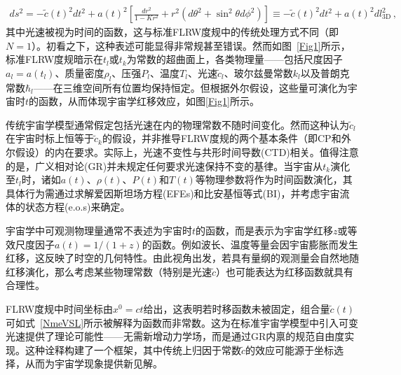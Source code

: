 \documentclass[jkps,preprint,fleqn]{revtex4}
\newcommand{\tc}{\tilde{c}}
\begin{document}
\begin{CJK*}{UTF8}{gbsn}
\begin{align}
ds^2 = - \tc(t)^2 dt^2 + a(t)^2 \left[ \frac{dr^2}{1-Kr^2} + r^2  \left( d \theta^2 + \sin^2 \theta d \phi^2 \right)  \right] \equiv - \tc(t)^2 dt^2 + a(t)^2 dl_{3\textrm{D}}^2 \label{dstgen} \,,
\end{align}
其中光速被视为时间的函数，这与标准FLRW度规中的传统处理方式不同（即$N=1$）。初看之下，这种表述可能显得非常规甚至错误。然而如图~\ref{Fig1}所示，标准FLRW度规暗示在$t_l$或$t_k$为常数的超曲面上，各类物理量——包括尺度因子$a_l = a(t_l)$、质量密度$\rho_l$、压强$P_l$、温度$T_l$、光速$\tc_l$、玻尔兹曼常数$k_l$以及普朗克常数$\hbar_l$——在三维空间所有位置均保持恒定。但根据外尔假设，这些量可演化为宇宙时$t$的函数，从而体现宇宙学红移效应，如图\ref{Fig1}所示。

传统宇宙学模型通常假定包括光速在内的物理常数不随时间变化。然而这种认为$\tc_l$在宇宙时标上恒等于$\tc_k$的假设，并非推导FLRW度规的两个基本条件（即CP和外尔假设）的内在要求。实际上，光速不变性与共形时间导数(CTD)相关。值得注意的是，广义相对论(GR)并未规定任何要求光速保持不变的基律。当宇宙从$t_k$演化至$t_l$时，诸如$a(t)$、$\rho(t)$、$P(t)$和$T(t)$等物理参数将作为时间函数演化，其具体行为需通过求解爱因斯坦场方程(EFEs)和比安基恒等式(BI)，并考虑宇宙流体的状态方程(e.o.s)来确定。

宇宙学中可观测物理量通常不表述为宇宙时$t$的函数，而是表示为宇宙学红移$z$或等效尺度因子$a(t) = 1/(1+z)$的函数。例如波长、温度等量会因宇宙膨胀而发生红移，这反映了时空的几何特性。由此视角出发，若具有量纲的观测量会自然地随红移演化，那么考虑某些物理常数（特别是光速$\tc$）也可能表达为红移函数就具有合理性。

FLRW度规中时间坐标由$x^0 = ct$给出，这表明若时移函数未被固定，组合量$\tc(t)$可如式~\eqref{NmeVSL}所示被解释为函数而非常数。这为在标准宇宙学模型中引入可变光速提供了理论可能性——无需新增动力学场，而是通过GR内禀的规范自由度实现\cite{Lee:2024zcu}。这种诠释构建了一个框架，其中传统上归因于常数$\tc$的效应可能源于坐标选择，从而为宇宙学现象提供新见解。


\end{CJK*}
\end{document}
